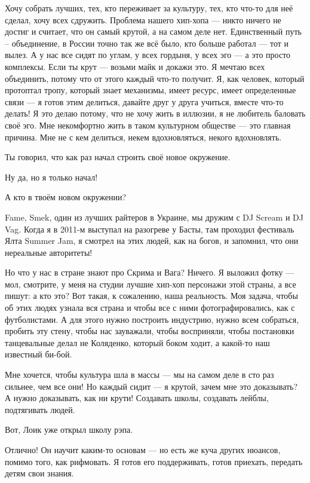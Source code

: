 Хочу собрать лучших, тех, кто переживает за культуру, тех, кто что-то для неё
сделал, хочу всех сдружить. Проблема нашего хип-хопа --- никто ничего не достиг и
считает, что он самый крутой, а на самом деле нет. Единственный путь –
объединение, в России точно так же всё было, кто больше работал --- тот и вылез.
А у нас все сидят по углам, у всех гордыня, у всех эго --- а это просто
комплексы. Если ты крут --- возьми майк и докажи это. Я мечтаю всех объединить,
потому что от этого каждый что-то получит. Я, как человек, который протоптал
тропу, который знает механизмы, имеет ресурс, имеет определенные связи --- я
готов этим делиться, давайте друг у друга учиться, вместе что-то делать! Я это
делаю потому, что не хочу жить в иллюзии, я не любитель баловать своё эго. Мне
некомфортно жить в таком культурном обществе --- это главная причина. Мне не с
кем делиться, некем вдохновляться, некого вдохновлять.  

Ты говорил, что как раз начал строить своё новое окружение.

Ну да, но я только начал!

А кто в твоём новом окружении?

Fame, Smek, один из лучших райтеров в Украине, мы дружим с DJ Scream и DJ Vag.
Когда я в 2011-м выступал на разогреве у Басты, там проходил фестиваль Ялта
Summer Jam, я смотрел на этих людей, как на богов, и запомнил, что они
нереальные авторитеты!

Но что у нас в стране знают про Скрима и Вага? Ничего. Я выложил фотку --- мол,
смотрите, у меня на студии лучшие хип-хоп персонажи этой страны, а все пишут: а
кто это? Вот такая, к сожалению, наша реальность. Моя задача, чтобы об этих
людях узнала вся страна и чтобы все с ними фотографировались, как с
футболистами. А для этого нужно построить индустрию, нужно всем собраться,
пробить эту стену, чтобы нас зауважали, чтобы восприняли, чтобы постановки
танцевальные делал не Коляденко, который боком ходит, а какой-то наш известный
би-бой.  

Мне хочется, чтобы культура шла в массы --- мы на самом деле в сто раз сильнее,
чем все они! Но каждый сидит --- я крутой, зачем мне это доказывать? А нужно
доказывать, как ни крути! Создавать школы, создавать лейблы, подтягивать людей. 

Вот, Лоик уже открыл школу рэпа.

Отлично! Он научит каким-то основам --- но есть же куча других нюансов, помимо
того, как рифмовать. Я готов его поддерживать, готов приехать, передать детям
свои знания.  

